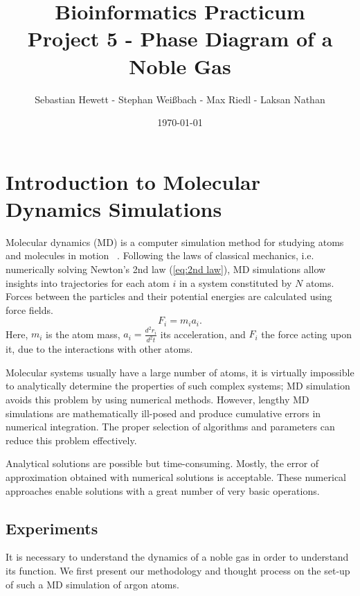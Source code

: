 \documentclass[10pt, a4paper, oneside, twocolumn]{report}
\title{Bioinformatics Practicum\\\textbf{Project 5 - Phase Diagram of a Noble Gas}}
\author{Sebastian Hewett - Stephan Weißbach - Max Riedl - Laksan Nathan}
\date{\today}
\begin{document}
\maketitle

\chapter{Introduction to Molecular Dynamics Simulations}

Molecular dynamics (MD) is a computer simulation method for studying atoms and molecules in motion ~\cite{Gonzalez}. Following the laws of classical mechanics, i.e. numerically solving Newton's 2nd law (\ref{eq:2nd law}), MD simulations allow insights into trajectories for each atom \(i\) in a system constituted by \(N\) atoms. Forces between the particles and their potential energies are calculated using force fields.
\begin{equation}\label{eq:2nd law}
F_i = m_i a_i.
\end{equation} %
Here, \(m_i\) is the atom mass, \(a_i = \frac{d^{2}r_i}{d^{2}t}\) its acceleration, and \(F_i\) the force acting upon it, due to the interactions with other atoms.

Molecular systems usually have a large number of atoms, it is virtually impossible to analytically determine the properties of such complex systems; MD simulation avoids this problem by using numerical methods. However, lengthy MD simulations are mathematically ill-posed and produce cumulative errors in numerical integration. The proper selection of algorithms and parameters can reduce this problem effectively.

Analytical solutions are possible but time-consuming. Mostly, the error of approximation obtained with numerical solutions is acceptable. These numerical approaches enable solutions with a great number of very basic operations.

\section{Experiments}

It is necessary to understand the dynamics of a noble gas in order to understand its function. We first present our methodology and thought process on the set-up of such a MD simulation of argon atoms.
\end{document}
